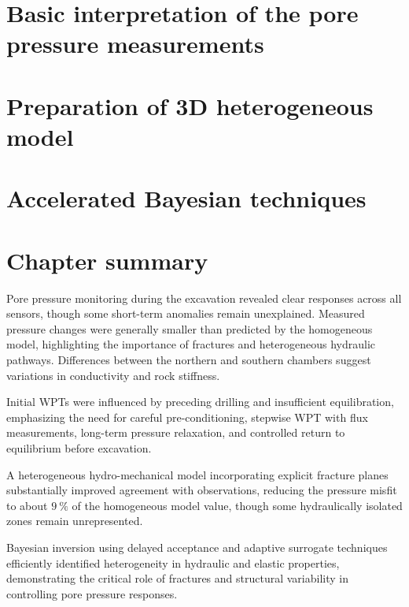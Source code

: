 
\section{Basic interpretation of the pore pressure measurements}
\label{sec:exp_interpretation}

%
%
\section{Preparation of 3D heterogeneous model}
\label{3D_excavation_model}


\section{Accelerated Bayesian techniques}
\label{sec:TSX_heterogeneity}


\section{Chapter summary}
Pore pressure monitoring during the excavation revealed clear responses across all sensors, though some short-term anomalies remain unexplained. Measured pressure changes were generally smaller than predicted by the homogeneous model, highlighting the importance of fractures and heterogeneous hydraulic pathways. Differences between the northern and southern chambers suggest variations in conductivity and rock stiffness.

Initial \Gls{WPT}s were influenced by preceding drilling and insufficient equilibration, emphasizing the need for careful pre-conditioning, stepwise \Gls{WPT} with flux measurements, long-term pressure relaxation, and controlled return to equilibrium before excavation.

A heterogeneous hydro-mechanical model incorporating explicit fracture planes substantially improved agreement with observations, reducing the pressure misfit to about $9~\%$ of the homogeneous model value, though some hydraulically isolated zones remain unrepresented.

Bayesian inversion using delayed acceptance and adaptive surrogate techniques efficiently identified heterogeneity in hydraulic and elastic properties, demonstrating the critical role of fractures and structural variability in controlling pore pressure responses.
